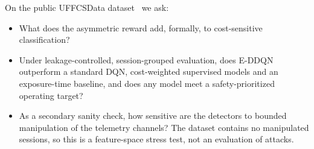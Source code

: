 On the public UFFCSData dataset~\cite{porcino2019uffcsdata} we ask:
\begin{itemize}
\item[RQ1] What does the asymmetric reward add, formally, to cost-sensitive classification?
\item[RQ2] Under leakage-controlled, session-grouped evaluation, does E-DDQN outperform a standard DQN, cost-weighted supervised models and an exposure-time baseline, and does any model meet a safety-prioritized operating target?
\item[RQ3] As a secondary sanity check, how sensitive are the detectors to bounded manipulation of the telemetry channels? The dataset contains no manipulated sessions, so this is a feature-space stress test, not an evaluation of attacks.
\end{itemize}

